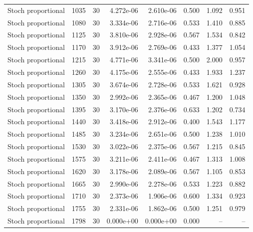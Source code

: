 \begin{scriptsize}
\begin{longtable}{llrrrrrr}
Stoch proportional & 1035 & 30 & 4.272e-06 & 2.610e-06 & 0.500 & 1.092 & 0.951 \\
Stoch proportional & 1080 & 30 & 3.334e-06 & 2.716e-06 & 0.533 & 1.410 & 0.885 \\
Stoch proportional & 1125 & 30 & 3.810e-06 & 2.928e-06 & 0.567 & 1.534 & 0.842 \\
Stoch proportional & 1170 & 30 & 3.912e-06 & 2.769e-06 & 0.433 & 1.377 & 1.054 \\
Stoch proportional & 1215 & 30 & 4.771e-06 & 3.341e-06 & 0.500 & 2.000 & 0.957 \\
Stoch proportional & 1260 & 30 & 4.175e-06 & 2.555e-06 & 0.433 & 1.933 & 1.237 \\
Stoch proportional & 1305 & 30 & 3.674e-06 & 2.728e-06 & 0.533 & 1.621 & 0.928 \\
Stoch proportional & 1350 & 30 & 2.992e-06 & 2.365e-06 & 0.467 & 1.200 & 1.048 \\
Stoch proportional & 1395 & 30 & 3.170e-06 & 2.376e-06 & 0.633 & 1.202 & 0.734 \\
Stoch proportional & 1440 & 30 & 3.418e-06 & 2.912e-06 & 0.400 & 1.543 & 1.177 \\
Stoch proportional & 1485 & 30 & 3.234e-06 & 2.651e-06 & 0.500 & 1.238 & 1.010 \\
Stoch proportional & 1530 & 30 & 3.022e-06 & 2.375e-06 & 0.567 & 1.215 & 0.845 \\
Stoch proportional & 1575 & 30 & 3.211e-06 & 2.411e-06 & 0.467 & 1.313 & 1.008 \\
Stoch proportional & 1620 & 30 & 3.178e-06 & 2.089e-06 & 0.567 & 1.105 & 0.853 \\
Stoch proportional & 1665 & 30 & 2.990e-06 & 2.278e-06 & 0.533 & 1.223 & 0.882 \\
Stoch proportional & 1710 & 30 & 2.373e-06 & 1.906e-06 & 0.600 & 1.334 & 0.923 \\
Stoch proportional & 1755 & 30 & 2.331e-06 & 1.862e-06 & 0.500 & 1.251 & 0.979 \\
Stoch proportional & 1798 & 30 & 0.000e+00 & 0.000e+00 & 0.000 & -- & -- \\
\bottomrule
\end{longtable}
\end{scriptsize}
